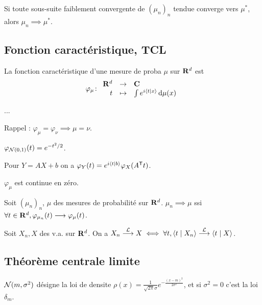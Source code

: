 	\begin{pop}
		Si toute sous-suite faiblement convergente de $(\mu_n)_n$ tendue converge vers $\mu^*$, alors $\mu_n \implies \mu^*$.
	\end{pop}


\subsection{Fonction caractéristique, TCL}

	La fonction caractéristique d'une mesure de proba $\mu$ sur $\mathbf{R}^d$ est
	$$\varphi_\mu \colon \begin{array}{rcl}
		\mathbf{R}^d & \to & \mathbf{C} \\
		t & \mapsto & \int e^{i \left\langle t \mid x \right\rangle} \mathop{}\mathopen{}\mathrm{d} \mu(x)
	\end{array}$$

	...
	
	Rappel : $\varphi_\mu = \varphi_\nu \implies \mu = \nu$.

	\begin{ex}
		$\varphi_{\mathcal{N}(0,1)}(t) = e^{-t^2/2}$.
	\end{ex}

	Pour $Y = AX + b$ on a $\varphi_Y(t) = e^{i \left\langle t \mid b \right\rangle} \varphi_X(A^\mathsf{T}t)$.

	\begin{pop}
		$\varphi_\mu$ est continue en zéro.
	\end{pop}

	\begin{thm}[de Lévy]
		Soit $(\mu_n)_n$, $\mu$ des mesures de probabilité sur $\mathbf{R}^d$.
		$\mu_n \implies \mu$ ssi $\forall t \in \mathbf{R}^d, \varphi_{\mu_n}(t) \longrightarrow \varphi_\mu(t)$.
	\end{thm}

	\begin{thm}
		Soit $X_n, X$ des v.a. sur $\mathbf{R}^d$.
		On a $X_n \overset{\mathcal{L}}{\longrightarrow} X \iff \forall t, \left\langle t \mid X_n \right\rangle \overset{\mathcal{L}}{\longrightarrow} \left\langle t \mid X \right\rangle$.
	\end{thm}
	

\subsection{Théorème centrale limite}

	\begin{note}
		$\mathcal{N}(m,\sigma^2)$ désigne la loi de densite $\rho(x) = \frac{1}{\sqrt{2\pi} \sigma} e^{-\frac{(x - m)^2}{2 \sigma^2}}$, et si $\sigma^2 = 0$ c'est la loi $\delta_m$.
	\end{note}

